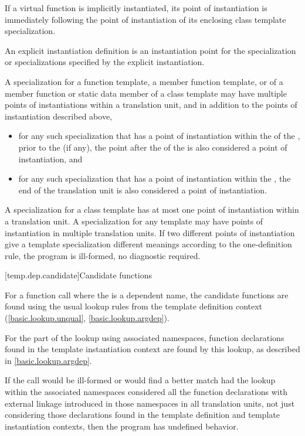 \pnum
If a virtual function is implicitly instantiated, its point of instantiation
is immediately following the point of instantiation of its enclosing class
template specialization.

\pnum
An explicit instantiation definition is an instantiation
point for the specialization or specializations specified by the explicit
instantiation.

\pnum
A specialization for a function template, a member function template,
or of a member function or static data member of a class template may have
multiple points of instantiations within a translation unit, and in addition
to the points of instantiation described above,
\begin{itemize}
\item
for any such
specialization that has a point of instantiation within the
 of the
,
prior to the  (if any),
the point after the 
of the 
is also considered a point of instantiation,
and
\item
for any such specialization that has a point of instantiation
within the ,
the end of the translation unit is also
considered a point of instantiation.
\end{itemize}
A specialization for a class template has at most one point of instantiation
within a translation unit.
A specialization for any template may have points of instantiation in multiple
translation units.
If two different points of instantiation give a template specialization
different meanings according to the one-definition rule,
the program is ill-formed, no diagnostic required.

[temp.dep.candidate]{Candidate functions}

\pnum
{}%
For a function call where the  is a
dependent name,
the candidate functions are found using the usual lookup
rules from the template definition context
(\ref{basic.lookup.unqual}, \ref{basic.lookup.argdep}).
\begin{note}
For the part of the lookup using associated namespaces,
function declarations found in the template instantiation context
are found by this lookup, as described in \ref{basic.lookup.argdep}.
\end{note}
If
the call would be ill-formed or would find a better match had the lookup
within the associated namespaces considered all the function declarations with
external linkage introduced in those namespaces in all translation units,
not just considering those declarations found in the template definition and
template instantiation contexts, then the program has undefined behavior.


